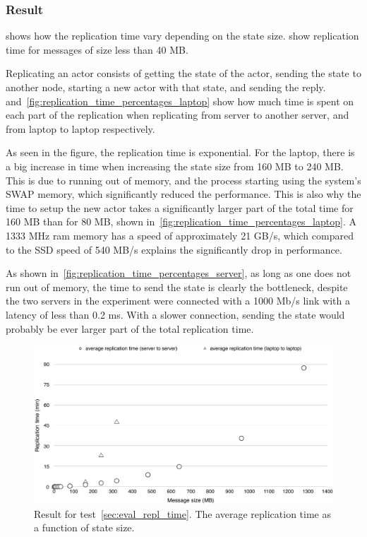 \documentclass{cslthse-msc}
\begin{document}
\subsubsection*{Result}
 shows how the replication time vary depending on the state size.  show replication time for messages of size less than 40 MB. 

Replicating an actor consists of getting the state of the actor, sending the state to another node, starting a new actor with that state, and sending the reply.  and~\cref{fig:replication_time_percentages_laptop} show how much time is spent on each part of the replication when replicating from server to another server, and from laptop to laptop respectively.

As seen in the figure, the replication time is exponential. For the laptop, there is a big increase in time when increasing the state size from 160 MB to 240 MB. This is due to running out of memory, and the process starting using the system's SWAP memory, which significantly reduced the performance. This is also why the time to setup the new actor takes a significantly larger part of the total time for 160 MB than for 80 MB, shown in~\cref{fig:replication_time_percentages_laptop}. A 1333 MHz ram memory has a speed of approximately 21 GB/s, which compared to the SSD speed of 540 MB/s explains the significantly drop in performance.

As shown in~\cref{fig:replication_time_percentages_server}, as long as one does not run out of memory, the time to send the state is clearly the bottleneck, despite the two servers in the experiment were connected with a 1000 Mb/s link with a latency of less than 0.2 ms. With a slower connection, sending the state would probably be ever larger part of the total replication time.


\begin{figure}[!hbt]
\centering
\includegraphics[scale=0.5]{images/results/replication_time.pdf} 
\caption{Result for test~\ref{sec:eval_repl_time}. The average replication time as a function of state size.}\label{fig:replication_time}
\end{figure}
\end{document}

